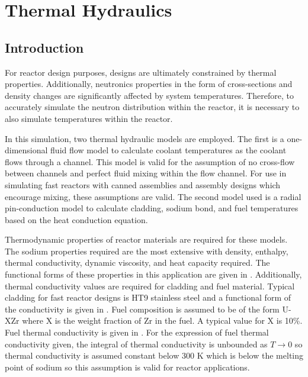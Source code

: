 \chapter{Thermal Hydraulics}
\label{ch:thermalHydraulics}

\section{Introduction}
  For reactor design purposes, designs are ultimately constrained by thermal
  properties. Additionally, neutronics properties in the form of cross-sections
  and density changes are significantly affected by system temperatures.
  Therefore, to accurately simulate the neutron distribution within the reactor,
  it is necessary to also simulate temperatures within the reactor.

  In this simulation, two thermal hydraulic models are
  employed. The first is a one-dimensional fluid flow model to calculate coolant
  temperatures as the coolant flows through a channel. This model is valid for
  the assumption of no cross-flow between channels and perfect fluid mixing 
  within the flow channel. For use in simulating fast reactors with canned
  assemblies and assembly designs which encourage mixing, these assumptions are
  valid. The second model used is a radial
  pin-conduction model to calculate cladding, sodium bond, and fuel temperatures
  based on the heat conduction equation.

  Thermodynamic properties of reactor materials are required for these models.
  The sodium properties required are the most extensive with density, enthalpy, 
  thermal conductivity, dynamic viscosity, and heat capacity required. The 
  functional forms of these properties in this application are given in 
  \cite{sodiumProp}. Additionally, thermal conductivity values are required for 
  cladding and fuel material. Typical cladding for fast reactor designs is HT9
  stainless steel and a functional form of the conductivity is given in
  \cite{ht9Prop}. Fuel composition is assumed to be of the form U-XZr where
  X is the weight fraction of Zr in the fuel. A typical value for X is 10\%.
  Fuel thermal conductivity is given in \cite{fuelProp}. For the expression of
  fuel thermal conductivity given, the integral of thermal conductivity 
  is unbounded as $T \rightarrow 0$ so thermal conductivity is assumed
  constant below 300 K which is below the melting point of sodium so this
  assumption is valid for reactor applications.


